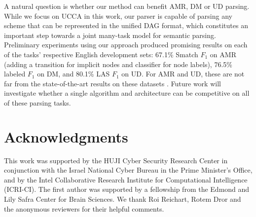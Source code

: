\documentclass[11pt,a4paper]{article}
\begin{document}
A natural question is whether our method can benefit AMR, DM or UD parsing.
While we focus on UCCA in this work, our parser is capable of parsing any
scheme that can be represented in the unified DAG format, which constitutes
an important step towards a joint many-task model for semantic parsing.
Preliminary experiments using our approach produced
promising results on each of the tasks' respective English development sets:
67.1\% Smatch $F_1$ \cite{cai2013smatch} on AMR
(adding a transition for implicit nodes and classifier for node labels),
76.5\% labeled $F_1$ on DM,
and 80.1\% LAS $F_1$ on UD.
For AMR and UD, these are not far from the state-of-the-art results on these datasets
\cite{foland2017abstract,dozat2016deep}.
Future work will investigate whether a single
algorithm and architecture can be competitive on all of these parsing tasks.


\section*{Acknowledgments}

This work was supported by the HUJI Cyber Security Research Center
in conjunction with the Israel National Cyber Bureau in the Prime Minister's Office,
and by the Intel Collaborative Research Institute for Computational Intelligence (ICRI-CI).
The first author was supported by a fellowship from the
Edmond and Lily Safra Center for Brain Sciences.
We thank Roi Reichart, Rotem Dror
and the anonymous reviewers for their helpful comments.




\end{document}
